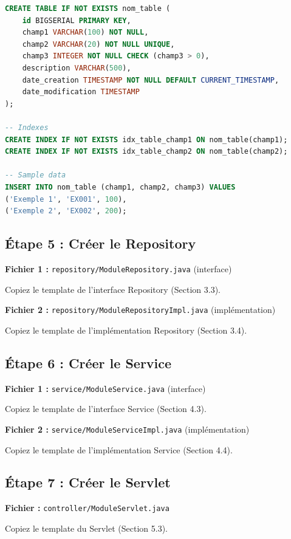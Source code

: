 \documentclass[12pt,a4paper]{article}
\begin{document}
\begin{lstlisting}[language=SQL]
CREATE TABLE IF NOT EXISTS nom_table (
    id BIGSERIAL PRIMARY KEY,
    champ1 VARCHAR(100) NOT NULL,
    champ2 VARCHAR(20) NOT NULL UNIQUE,
    champ3 INTEGER NOT NULL CHECK (champ3 > 0),
    description VARCHAR(500),
    date_creation TIMESTAMP NOT NULL DEFAULT CURRENT_TIMESTAMP,
    date_modification TIMESTAMP
);

-- Indexes
CREATE INDEX IF NOT EXISTS idx_table_champ1 ON nom_table(champ1);
CREATE INDEX IF NOT EXISTS idx_table_champ2 ON nom_table(champ2);

-- Sample data
INSERT INTO nom_table (champ1, champ2, champ3) VALUES
('Exemple 1', 'EX001', 100),
('Exemple 2', 'EX002', 200);
\end{lstlisting}

\subsection{Étape 5 : Créer le Repository}

\textbf{Fichier 1 :} \texttt{repository/ModuleRepository.java} (interface)

Copiez le template de l'interface Repository (Section 3.3).

\textbf{Fichier 2 :} \texttt{repository/ModuleRepositoryImpl.java} (implémentation)

Copiez le template de l'implémentation Repository (Section 3.4).

\subsection{Étape 6 : Créer le Service}

\textbf{Fichier 1 :} \texttt{service/ModuleService.java} (interface)

Copiez le template de l'interface Service (Section 4.3).

\textbf{Fichier 2 :} \texttt{service/ModuleServiceImpl.java} (implémentation)

Copiez le template de l'implémentation Service (Section 4.4).

\subsection{Étape 7 : Créer le Servlet}

\textbf{Fichier :} \texttt{controller/ModuleServlet.java}

Copiez le template du Servlet (Section 5.3).
\end{document}
